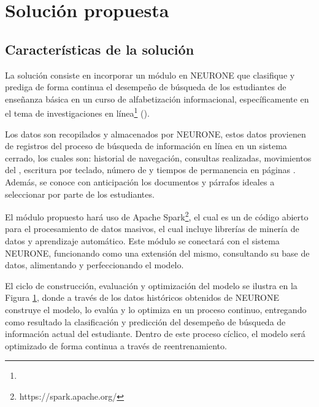 \section{Solución propuesta}
\label{sec:solucion_propuesta}

\subsection{Características de la solución}
\label{subsec:caracteristicas-solucion}
La solución consiste en incorporar un módulo en NEURONE \parencite{gonzalez2017neurone} que clasifique y prediga de forma continua el desempeño de búsqueda de los estudiantes de enseñanza básica en un curso de alfabetización informacional, específicamente en el tema de investigaciones en línea\footnote{\traduccionlibre} (). 

Los datos son recopilados y almacenados por NEURONE, estos datos provienen de registros del proceso de búsqueda de información en línea en un sistema cerrado, los cuales son: historial de navegación, consultas realizadas, movimientos del , escritura por teclado, número de  y tiempos de permanencia en páginas . Además, se conoce con anticipación los documentos y párrafos ideales a seleccionar por parte de los estudiantes.

El módulo propuesto hará uso de Apache Spark\footnote{https://spark.apache.org/}, el cual es un  de código abierto para el procesamiento de datos masivos, el cual incluye librerías de minería de datos y aprendizaje automático. Este módulo se conectará con el sistema NEURONE, funcionando como una extensión del mismo, consultando su base de datos, alimentando y perfeccionando el modelo. 

El ciclo de construcción, evaluación y optimización del modelo se ilustra en la Figura \ref{fig:ml-pipeline}, donde a través de los datos históricos obtenidos de NEURONE construye el modelo, lo evalúa y lo optimiza en un proceso continuo, entregando como resultado la clasificación y predicción del desempeño de búsqueda de información actual del estudiante. Dentro de este proceso cíclico, el modelo será optimizado de forma continua a través de reentrenamiento.

\begin{figure}[H]
	\centering
	\scalebox{0.8}{}
	\label{fig:ml-pipeline}
\end{figure}


